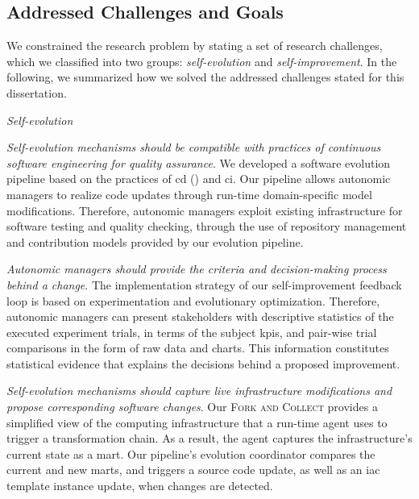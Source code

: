 \subsection{Addressed Challenges and Goals}
\label{subsect:conclusions--challenges-and-goals}

We constrained the research problem by stating a set of research challenges, which we classified into two groups: \emph{self-evolution} and \emph{self-improvement}. In the following, we summarized how we solved the addressed challenges stated for this dissertation.

\textit{Self-evolution}

\begin{description}[leftmargin=4.2em]
	\item[\textsc{Ch}1:] \emph{Self-evolution mechanisms should be compatible with practices of continuous software engineering for quality assurance}. We developed a software evolution pipeline based on the practices of \gls{cd} () and \gls{ci}. Our pipeline allows autonomic managers to realize code updates through run-time domain-specific model modifications. Therefore, autonomic managers exploit existing infrastructure for software testing and quality checking, through the use of repository management and contribution models provided by our evolution pipeline.

	\item[\textsc{Ch}2:] \emph{Autonomic managers should provide the criteria and decision-making process behind a change}. The implementation strategy of our self-improvement feedback loop is based on experimentation and evolutionary optimization. Therefore, autonomic managers can present stakeholders with descriptive statistics of the executed experiment trials, in terms of the subject \glspl{kpi}, and pair-wise trial comparisons in the form of raw data and charts. This information constitutes statistical evidence that explains the decisions behind a proposed improvement.

	\item[\textsc{Ch}3:] \emph{Self-evolution mechanisms should capture live infrastructure modifications and propose corresponding software changes}. Our \textsc{Fork and Collect} provides a simplified view of the computing infrastructure that a run-time agent uses to trigger a transformation chain. As a result, the agent captures the infrastructure's current state as a \gls{mart}. Our pipeline's evolution coordinator compares the current and new \glspl{mart}, and triggers a source code update, as well as an \gls{iac} template instance update, when changes are detected.
\end{description}

